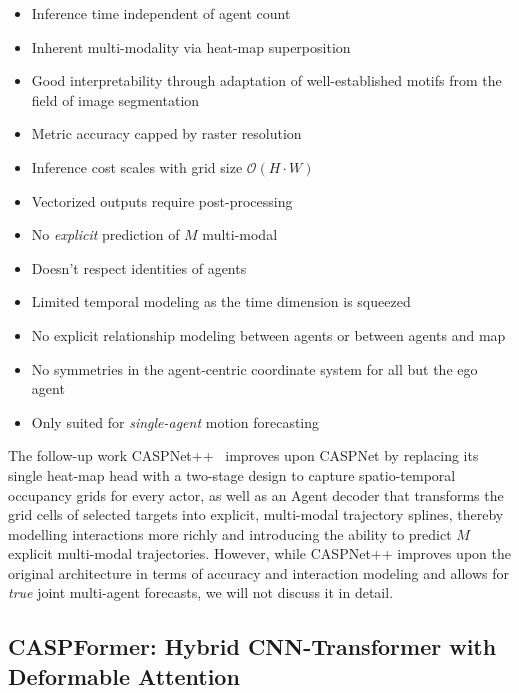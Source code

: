 \begin{description}[leftmargin=1em,itemsep=2pt]
\begin{itemize}[leftmargin=*, label=\greenoplus]
  \item Inference time independent of agent count
  \item Inherent multi-modality via heat-map superposition
  \item Good interpretability through adaptation of well-established motifs from the field of image segmentation
\end{itemize}

\begin{itemize}[leftmargin=*, label=\redominus]
  \item Metric accuracy capped by raster resolution
  \item Inference cost scales with grid size \( \mathcal{O}(H \cdot W) \)
  \item Vectorized outputs require post-processing
  \item No \emph{explicit} prediction of \( M \) multi-modal
  \item Doesn't respect identities of agents
  \item Limited temporal modeling as the time dimension is squeezed
  \item No explicit relationship modeling between agents or between agents and map
  \item No symmetries in the agent-centric coordinate system for all but the ego agent
  \item Only suited for \emph{single-agent} motion forecasting
\end{itemize}

The follow-up work CASPNet++~\cite{caspnetppSchäfer2023} improves upon CASPNet by replacing its single heat-map head with a two-stage design to capture spatio-temporal occupancy grids for every actor, as well as an Agent decoder that transforms the grid cells of selected targets into explicit, multi-modal trajectory splines, thereby modelling interactions more richly and introducing the ability to predict \( M \) explicit multi-modal trajectories. However, while CASPNet++ improves upon the original architecture in terms of accuracy and interaction modeling and allows for \emph{true} joint multi-agent forecasts, we will not discuss it in detail.

\subsection{CASPFormer: Hybrid CNN-Transformer with Deformable Attention}
\label{ssec:caspformer}


\end{description}
